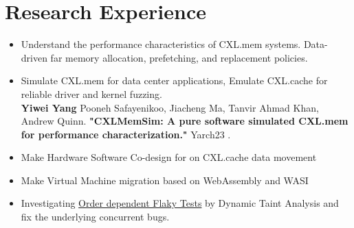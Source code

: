\documentclass{resume}
\newcommand{\en}[1]{#1}
\newcommand{\zh}[1]{}
\begin{document}
\section{\en{Research Experience}\zh{研究经历}}

\en{}
\zh{\datedsubsection{\textbf{\href{https://www.ssrc.ucsc.edu/index.html}{加州大学圣克鲁兹分校存储中心}}}{08/2022 -- 现在}}
\en{}
\zh{\role{研究生科研}{助理}}
\begin{itemize}
      \item \small{ \en{Understand the performance characteristics of CXL.mem systems. Data-driven far memory allocation, prefetching, and replacement policies. } \zh{理解CXL.mem的性能分析。数据驱动的远端内存分配、预取和替换策略。}}
      \item{\small \en{Simulate CXL.mem for data center applications, Emulate CXL.cache for reliable driver and kernel fuzzing.}
      \zh{模拟CXL.mem数据中心应用，为kernel可靠性模拟CXL.cache设备。}}
      \\
      \textbf{Yiwei Yang} Pooneh Safayenikoo, Jiacheng Ma, Tanvir Ahmad Khan, Andrew Quinn. \textbf{"CXLMemSim: A pure software simulated CXL.mem for performance characterization."} Yarch23  .
      \item \small{ \en{Make Hardware Software Co-design for on CXL.cache data movement}
      \zh{设计一种硬件软件协同的CXL.cache数据迁移方法。}}
      \item \small{ \en{Make Virtual Machine migration based on WebAssembly and WASI}
      \zh{设计一种基于WebAssembly和WASI的虚拟机迁移方法。}}
\end{itemize}

\en{}
\zh{\datedsubsection{\textbf{\href{https://illinois.edu}{伊利诺伊大学厄巴纳-香槟分校}\href{http://mir.cs.illinois.edu/marinov/}{Darko Marinov组}}}{2021/07 -- 2021/10}}
\en{}
\zh{\role{本科生科研}{暑研项目}}
\begin{itemize}
      \item \en{Investigating \href{https://victoryang00.cn/wordpress/2022/08/09/final-report-of-program-analysis/}{Order dependent Flaky Tests} by Dynamic Taint Analysis and fix the underlying concurrent bugs.}
            \zh{使用动态污点分析在Flaky数据集上进行\href{https://victoryang00.cn/wordpress/2022/08/09/final-report-of-program-analysis/}{数据依赖变量检测}，并修复java写的并行系统中的并发bug。}
\end{itemize}
\end{document}

